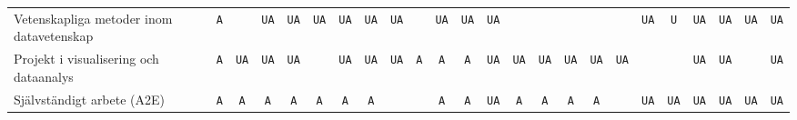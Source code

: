 \begin{sidewaystable}
{\begin{tabular}{lccccccccccccccccccccccc}
Vetenskapliga metoder inom datavetenskap              & \texttt{A}   &     & \texttt{UA}  & \texttt{UA}  & \texttt{UA}  & \texttt{UA}  & \texttt{UA}  & \texttt{UA}  &     & \texttt{UA}  & \texttt{UA}  & \texttt{UA}  &     &     &     &     &     & \texttt{UA}  & \texttt{U}   & \texttt{UA}  & \texttt{UA}  & \texttt{UA}  & \texttt{UA}                  \tabularnewline
Projekt i visualisering och dataanalys                & \texttt{A}   & \texttt{UA}  & \texttt{UA}  & \texttt{UA}  &     & \texttt{UA}  & \texttt{UA}  & \texttt{UA}  & \texttt{A}   & \texttt{A}   & \texttt{A}   & \texttt{UA}  & \texttt{UA}  & \texttt{UA}  & \texttt{UA}  & \texttt{UA}  & \texttt{UA}  &     &     & \texttt{UA}  & \texttt{UA}  &     & \texttt{UA}                  \tabularnewline
Självständigt arbete (A2E)                            & \texttt{A}   & \texttt{A}   & \texttt{A}   & \texttt{A}   & \texttt{A}   & \texttt{A}   & \texttt{A}   &     &     & \texttt{A}   & \texttt{A}   & \texttt{UA}  & \texttt{A}   & \texttt{A}   & \texttt{A}   & \texttt{A}   &     & \texttt{UA}  & \texttt{UA}  & \texttt{UA}  & \texttt{UA}  & \texttt{UA}  & \texttt{UA}                  \tabularnewline
\bottomrule
\end{tabular}}
\end{sidewaystable}